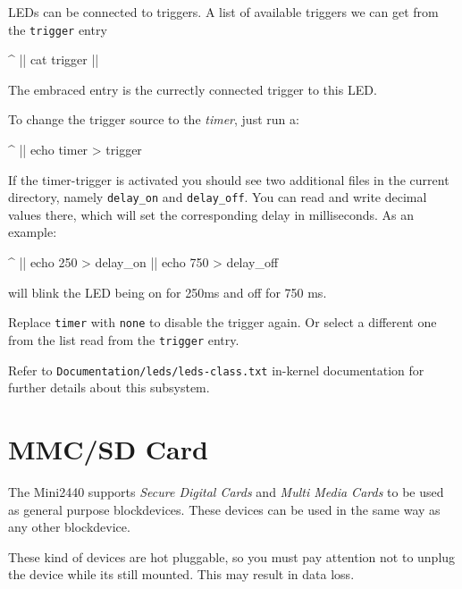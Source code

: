 LEDs can be connected to triggers. A list of available triggers we can get from the
\texttt{trigger} entry

\begin{ptxshell}[escapechar=|]{^}
|\LedPath| cat trigger
|\perAvailableTriggers{}|
\end{ptxshell}

The embraced entry is the currectly connected trigger to this LED.

To change the trigger source to the \textit{timer}, just run a:

\begin{ptxshell}[escapechar=|]{^}
|\LedPath| echo timer > trigger
\end{ptxshell}

If the timer-trigger is activated you should see two additional files in the
current directory, namely \texttt{delay\_on} and \texttt{delay\_off}. You can
read and write decimal values there, which will set the corresponding delay in
milliseconds. As an example:

\begin{ptxshell}[escapechar=|]{^}
|\LedPath| echo 250 > delay_on
|\LedPath| echo 750 > delay_off
\end{ptxshell}

will blink the LED being on for 250ms and off for 750 ms.

Replace \texttt{timer} with \texttt{none} to disable the trigger again. Or
select a different one from the list read from the \texttt{trigger} entry.

Refer to \texttt{Documentation/leds/leds-class.txt} in-kernel documentation for
further details about this subsystem.


\section{MMC/SD Card}					\label{sec:SDC}

The Mini2440 supports \textit{Secure Digital Cards} and
\textit{Multi Media Cards} to be used as general purpose blockdevices. These
devices can be used in the same way as any other blockdevice.

\begin{important}
These kind of devices are hot pluggable, so you must pay attention not to
unplug the device while its still mounted. This may result in data loss.
\end{important}

